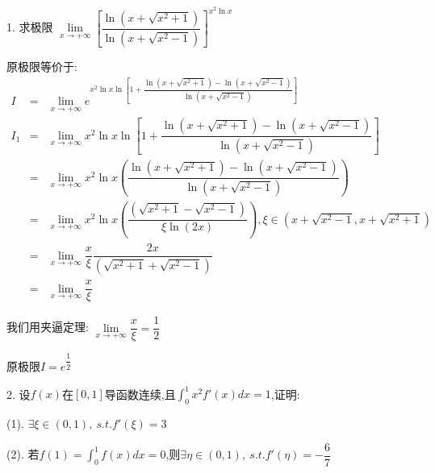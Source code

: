 1. 求极限 $\lim\limits_{x\rightarrow +\infty}\left[ \dfrac{\ln(x+\sqrt{x^2+1})}{\ln(x+\sqrt{x^2-1})}\right]^{x^2\ln x} $
\begin{solution}
	
	原极限等价于: 
	\begin{eqnarray*}
		I&=&\lim\limits_{x\rightarrow+\infty}e^{x^2\ln x\ln\left[1+\dfrac{\ln(x+\sqrt{x^2+1})-\ln(x+\sqrt{x^2-1})}{\ln(x+\sqrt{x^2-1})} \right] }\\
		I_{1}&=&\lim\limits_{x\rightarrow+\infty}x^2\ln x\ln\left[1+\dfrac{\ln(x+\sqrt{x^2+1})-\ln(x+\sqrt{x^2-1})}{\ln(x+\sqrt{x^2-1})} \right] \\
		&=&\lim\limits_{x\rightarrow+\infty}x^2\ln x(\dfrac{\ln(x+\sqrt{x^2+1})-\ln(x+\sqrt{x^2-1})}{\ln(x+\sqrt{x^2-1})})\\
		&=&\lim\limits_{x\rightarrow+\infty}x^2\ln x(\dfrac{(\sqrt{x^2+1}-\sqrt{x^2-1})}{\xi \ln(2x)}), \xi\in(x+\sqrt{x^2-1},x+\sqrt{x^2+1})\\
		&=&\lim\limits_{x\rightarrow+\infty}\dfrac{x}{\xi}\dfrac{2x}{(\sqrt{x^2+1}+\sqrt{x^2-1})}\\
		&=&\lim\limits_{x\rightarrow+\infty}\dfrac{x}{\xi}
	\end{eqnarray*}
	
	我们用夹逼定理: $\lim\limits_{x\rightarrow+\infty}\dfrac{x}{\xi}=\dfrac{1}{2}$
	
	原极限$I=e^{\dfrac{1}{2}}$
\end{solution}
2. 设$f(x)$在$[0,1]$导函数连续,且$\int_{0}^{1}x^2f'(x)dx=1$,证明: 

(1). $\exists \xi\in(0,1),\ s.t. f'(\xi)=3$

(2). 若$f(1)=\int_{0}^{1}f(x)dx=0$,则$\exists \eta\in(0,1), \ s.t. f'(\eta)=-\dfrac{6}{7}$

